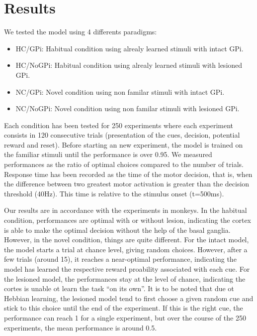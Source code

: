 \section{Results}
We tested the model using 4 differents paradigms:
\begin{itemize}
\item HC/GPi:   Habitual condition using alrealy learned stimuli with intact GPi.
\item HC/NoGPi: Habitual condition using alrealy learned stimuli with lesioned GPi.
\item NC/GPi:   Novel condition using non familar stimuli with intact GPi.
\item NC/NoGPi: Novel condition using non familar stimuli with lesioned GPi.
\end{itemize}
Each condition has been tested for 250 experiments where each experiment
consists in 120 consecutive trials (presentation of the cues, decision,
potential reward and reset). Before starting an new experiment, the model is
trained on the familiar stimuli until the performance is over 0.95. We measured
performances as the ratio of optimal choices compared to the number of
trials. Response time has been recorded as the time of the motor decision, that
is, when the difference between two greatest motor activation is greater than
the decision threshold (40Hz). This time is relative to the stimulus onset
(t=500ms).

Our results are in accordance with the experiments in monkeys. In the habitual
condition, performances are optimal with or without lesion, indicating the
cortex is able to make the optimal decision without the help of the basal
ganglia. However, in the novel condition, things are quite different. For the
intact model, the model starts a trial at chance level, giving random
choices. However, after a few trials (around 15), it reaches a near-optimal
performance, indicating the model has learned the respective reward proability
associated with each cue. For the lesioned model, the performances stay at the
level of chance, indicating the cortes is unable ot learn the task ``on its
own''. It is to be noted that due ot Hebbian learning, the lesioned model tend
to first choose a given random cue and stick to this choice until the end of
the experiment. If this is the right cue, the performance can reach 1 for a
single experiment, but over the course of the 250 experiments, the mean
performance is around 0.5.




